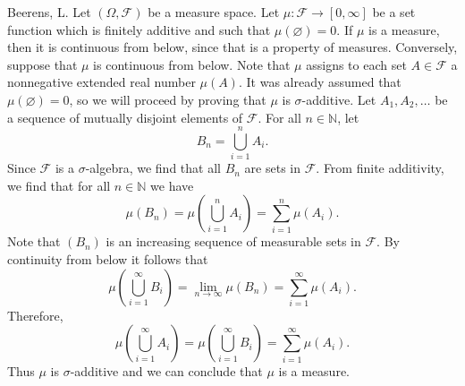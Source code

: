 \begin{solution}[3.14]{Beerens, L.}
    Let $(\Omega,\mathcal{F})$ be a measure space. Let $\mu:\mathcal{F}\rightarrow[0,\infty]$ be a set function which is finitely additive and such that $\mu(\varnothing) = 0$. If $\mu$ is a measure, then it is continuous from below, since that is a property of measures. Conversely, suppose that $\mu$ is continuous from below. Note that $\mu$ assigns to each set $A\in\mathcal{F}$ a nonnegative extended real number $\mu(A)$. It was already assumed that $\mu(\varnothing) =0$, so we will proceed by proving that $\mu$ is $\sigma$-additive. Let $A_1, A_2,\hdots$ be a sequence of mutually disjoint elements of $\mathcal{F}$. For all $n\in\mathbb{N}$, let 
    $$
        B_n = \bigcup_{i=1}^n A_i.
    $$
    Since $\mathcal{F}$ is a $\sigma$-algebra, we find that all $B_n$ are sets in $\mathcal{F}$.
    From finite additivity, we find that for all $n\in\mathbb{N}$ we have
    $$
        \mu(B_n) = \mu\left( \bigcup_{i=1}^n A_i \right) = \sum_{i=1}^n \mu(A_i). 
    $$
    Note that $(B_n)$ is an increasing sequence of measurable sets in $\mathcal{F}$. By continuity from below it follows that
    $$
        \mu\left( \bigcup_{i=1}^\infty B_i \right) = \lim_{n\rightarrow\infty}\mu(B_n) = \sum_{i=1}^\infty\mu(A_i).
    $$
    Therefore,
    $$
        \mu\left( \bigcup_{i=1}^\infty A_i \right) = \mu\left( \bigcup_{i=1}^\infty B_i \right) = \sum_{i=1}^\infty\mu(A_i).
    $$
    Thus $\mu$ is $\sigma$-additive and we can conclude that $\mu$ is a measure.
\end{solution}

